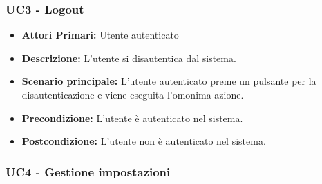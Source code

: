 \subsubsection{ UC3 - Logout}
\begin{itemize}
           	\item\textbf{Attori Primari:} 
           	Utente autenticato
           	\item\textbf{Descrizione:} 
           	L'utente si disautentica dal sistema.
           	\item\textbf{Scenario principale:} 
           	L'utente autenticato preme un pulsante per la disautenticazione e viene eseguita l'omonima azione.
           	\item\textbf{Precondizione:} 
           	L'utente è autenticato nel sistema.
           	\item\textbf{Postcondizione:}
           	L'utente non è autenticato nel sistema.
\end{itemize}

\subsubsection{ UC4 - Gestione impostazioni}

